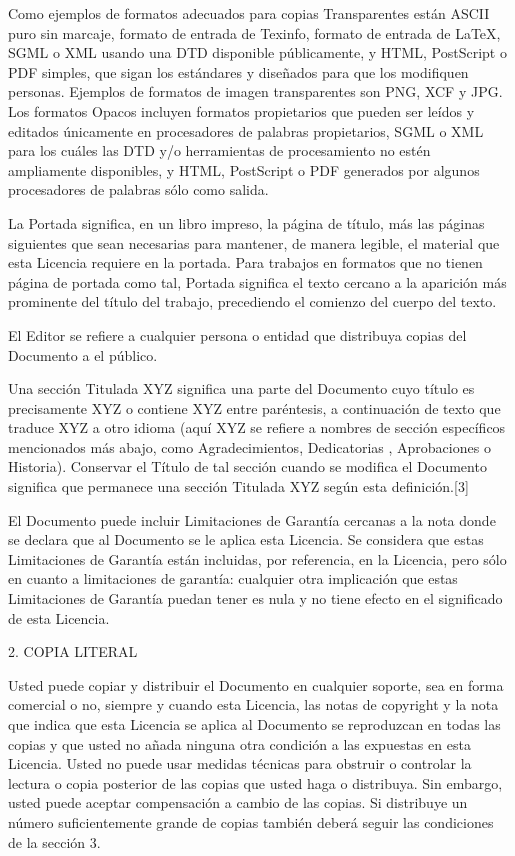 \documentclass[a4paper, 11pt, oneside]{report}
\begin{document}
Como ejemplos de formatos adecuados para copias Transparentes están ASCII puro sin marcaje, formato de entrada de Texinfo, formato de entrada de LaTeX, SGML o XML usando una DTD disponible públicamente, y HTML, PostScript o PDF simples, que sigan los estándares y diseñados para que los modifiquen personas. Ejemplos de formatos de imagen transparentes son PNG, XCF y JPG. Los formatos Opacos incluyen formatos propietarios que pueden ser leídos y editados únicamente en procesadores de palabras propietarios, SGML o XML para los cuáles las DTD y/o herramientas de procesamiento no estén ampliamente disponibles, y HTML, PostScript o PDF generados por algunos procesadores de palabras sólo como salida.

La Portada significa, en un libro impreso, la página de título, más las páginas siguientes que sean necesarias para mantener, de manera legible, el material que esta Licencia requiere en la portada. Para trabajos en formatos que no tienen página de portada como tal, Portada significa el texto cercano a la aparición más prominente del título del trabajo, precediendo el comienzo del cuerpo del texto.

El Editor se refiere a cualquier persona o entidad que distribuya copias del Documento a el público.

Una sección Titulada XYZ significa una parte del Documento cuyo título es precisamente XYZ o contiene XYZ entre paréntesis, a continuación de texto que traduce XYZ a otro idioma (aquí XYZ se refiere a nombres de sección específicos mencionados más abajo, como Agradecimientos, Dedicatorias , Aprobaciones o Historia). Conservar el Título de tal sección cuando se modifica el Documento significa que permanece una sección Titulada XYZ según esta definición.[3]

El Documento puede incluir Limitaciones de Garantía cercanas a la nota donde se declara que al Documento se le aplica esta Licencia. Se considera que estas Limitaciones de Garantía están incluidas, por referencia, en la Licencia, pero sólo en cuanto a limitaciones de garantía: cualquier otra implicación que estas Limitaciones de Garantía puedan tener es nula y no tiene efecto en el significado de esta Licencia.

2. COPIA LITERAL

Usted puede copiar y distribuir el Documento en cualquier soporte, sea en forma comercial o no, siempre y cuando esta Licencia, las notas de copyright y la nota que indica que esta Licencia se aplica al Documento se reproduzcan en todas las copias y que usted no añada ninguna otra condición a las expuestas en esta Licencia. Usted no puede usar medidas técnicas para obstruir o controlar la lectura o copia posterior de las copias que usted haga o distribuya. Sin embargo, usted puede aceptar compensación a cambio de las copias. Si distribuye un número suficientemente grande de copias también deberá seguir las condiciones de la sección 3.
\end{document}
